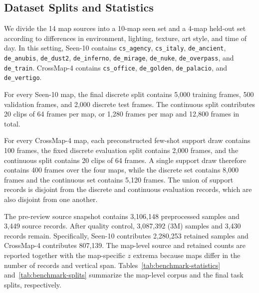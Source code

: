 \subsection{Dataset Splits and Statistics}
\label{subsec:benchmark-splits}

We divide the 14 map sources into a 10-map seen set and a 4-map held-out set according to differences in environment, lighting, texture, art style, and time of day.
In this setting, Seen-10 contains \texttt{cs\_agency}, \texttt{cs\_italy}, \texttt{de\_ancient}, \texttt{de\_anubis}, \texttt{de\_dust2}, \texttt{de\_inferno}, \texttt{de\_mirage}, \texttt{de\_nuke}, \texttt{de\_overpass}, and \texttt{de\_train}.
CrossMap-4 contains \texttt{cs\_office}, \texttt{de\_golden}, \texttt{de\_palacio}, and \texttt{de\_vertigo}.

For every Seen-10 map, the final discrete split contains 5,000 training frames, 500 validation frames, and 2,000 discrete test frames.
The continuous split contributes 20 clips of 64 frames per map, or 1,280 frames per map and 12,800 frames in total.

For every CrossMap-4 map, each preconstructed few-shot support draw contains 100 frames, the fixed discrete evaluation split contains 2,000 frames, and the continuous split contains 20 clips of 64 frames.
A single support draw therefore contains 400 frames over the four maps, while the discrete set contains 8,000 frames and the continuous set contains 5,120 frames.
The union of support records is disjoint from the discrete and continuous evaluation records, which are also disjoint from one another.

The pre-review source snapshot contains 3,106,148 preprocessed samples and 3,449 source records. After quality control, 3,087,392 (3M) samples and 3,430 records remain.
Specifically, Seen-10 contributes 2,280,253 retained samples and CrossMap-4 contributes 807,139.
The map-level source and retained counts are reported together with the map-specific $z$ extrema because maps differ in the number of records and vertical span.
Tables~\ref{tab:benchmark-statistics} and~\ref{tab:benchmark-splits} summarize the map-level corpus and the final task splits, respectively.

